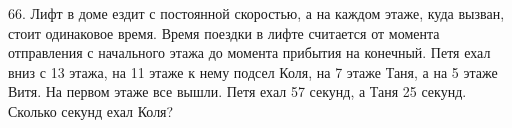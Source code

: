 66. Лифт в доме ездит с постоянной скоростью, а на каждом этаже, куда вызван, стоит одинаковое время. Время поездки в лифте считается от момента отправления с начального этажа до момента прибытия на конечный. Петя ехал вниз с 13 этажа, на 11 этаже к нему подсел Коля, на 7 этаже Таня, а на 5 этаже Витя. На первом этаже все вышли. Петя ехал 57 секунд, а Таня 25 секунд. Сколько секунд ехал Коля?\\
